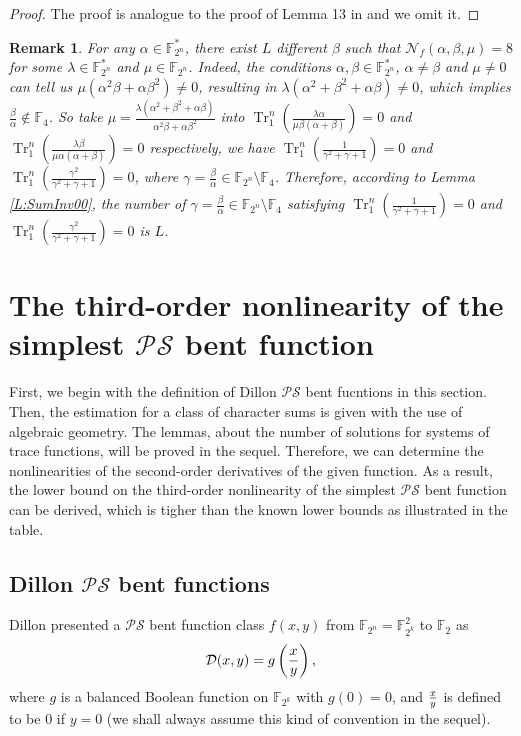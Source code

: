 \documentclass{article}
\newcommand{\F}{\mathbb{F}}
\newcommand{\0}{\textbf{0}}
\newcommand{\1}{\textbf{1}}
\newcommand{\TrN}{\operatorname{Tr}_1^n}
\theoremstyle{plain}
\newtheorem{remark}{Remark}
\begin{document}
    \begin{proof}
        The proof is analogue to the proof of Lemma 13 in \cite{tang2022invfunc} and we omit it.
    \end{proof}
    \begin{remark}
        For any $ \alpha\in\F_{2^n}^* $, there exist $ L $ different $ \beta $ 
        such that $ \mathcal{N}_f(\alpha,\beta,\mu)=8 $ for some $ \lambda\in\F_{2^n}^* $ and $ \mu\in\F_{2^n} $. 
        Indeed, the conditions $ \alpha,\beta\in\F_{2^n}^* $, $ \alpha\ne\beta $ and $ \mu\ne 0 $ 
        can tell us $ \mu(\alpha^2\beta+\alpha\beta^2)\ne 0 $, 
        resulting in $ \lambda(\alpha^2+\beta^2+\alpha\beta)\ne 0 $, 
        which implies $ \frac{\beta}{\alpha}\notin\F_4 $.
        So take $ \mu=\frac{\lambda(\alpha^2+\beta^2+\alpha\beta)}{\alpha^2\beta+\alpha\beta^2} $ 
        into $ \TrN\left(\frac{\lambda \alpha}{\mu \beta(\alpha+\beta)}\right)=0 $ 
        and $ \TrN\left(\frac{\lambda \beta}{\mu \alpha(\alpha+\beta)}\right)=0 $ respectively, 
        we have $ \TrN\left(\frac{1}{\gamma^2+\gamma+1}\right)=0 $ and $ \TrN\left(\frac{\gamma^2}{\gamma^2+\gamma+1}\right)=0 $, 
        where $ \gamma=\frac{\beta}{\alpha}\in\F_{2^n}\setminus\F_{4} $. 
        Therefore, according to Lemma \ref{L:SumInv00}, 
        the number of $ \gamma=\frac{\beta}{\alpha}\in\F_{2^n}\setminus\F_{4} $ satisfying 
        $ \TrN\left(\frac{1}{\gamma^2+\gamma+1}\right)=0 $ and $ \TrN\left(\frac{\gamma^2}{\gamma^2+\gamma+1}\right)=0 $ 
        is $ L $.
    \end{remark}
   


\section{The third-order nonlinearity of the simplest $ \mathcal{PS} $ bent function}
    First, we begin with the definition of Dillon $ \mathcal{PS} $ bent fucntions in this section. 
    Then, the estimation for a class of character sums is given with the use of algebraic geometry. 
    The lemmas, about the number of solutions for systems of trace functions, will be proved in the sequel. 
    Therefore, we can determine the nonlinearities of the second-order derivatives of the given function. 
    As a result, the lower bound on the third-order nonlinearity of the simplest $ \mathcal{PS} $ bent function can be derived, which is tigher than the known lower bounds as illustrated in the table.
    \subsection{Dillon $ \mathcal{PS} $ bent functions}
    Dillon presented a $ \mathcal{PS} $ bent function class $ f(x,y) $ from $ \F_{2^n}=\F_{2^k}^2 $ 
    to $ \F_2 $ as 
    \begin{equation*}\label{Eqn_PS_bent}
        \mathcal{D}(x,y)=g\left({x\over y}\right),
    \end{equation*}
    where $ g $ is a balanced Boolean function on $ \F_{2^{k}} $ with $ g(0)=0 $, 
    and ${ x\over y }$ is defined to be $ 0 $ if $ y=0 $ 
    (we shall always assume this kind of convention in the sequel).
\end{document}
